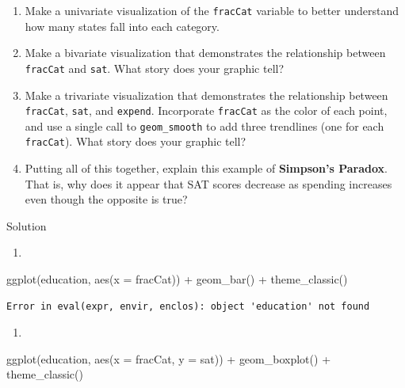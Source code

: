 \documentclass[
  letterpaper,
  DIV=11,
  numbers=noendperiod]{scrreprt}
\newenvironment{Shaded}{\begin{snugshade}}{\end{snugshade}}
\newcommand{\AttributeTok}[1]{\textcolor[rgb]{0.40,0.45,0.13}{#1}}
\newcommand{\FunctionTok}[1]{\textcolor[rgb]{0.28,0.35,0.67}{#1}}
\newcommand{\NormalTok}[1]{\textcolor[rgb]{0.00,0.23,0.31}{#1}}
\newcommand{\SpecialCharTok}[1]{\textcolor[rgb]{0.37,0.37,0.37}{#1}}
\providecommand{\tightlist}{%
  \setlength{\itemsep}{0pt}\setlength{\parskip}{0pt}}\usepackage{longtable,booktabs,array}
\begin{document}
\begin{enumerate}
\def\labelenumi{\alph{enumi}.}
\tightlist
\item
  Make a univariate visualization of the \texttt{fracCat} variable to
  better understand how many states fall into each category.\\
\item
  Make a bivariate visualization that demonstrates the relationship
  between \texttt{fracCat} and \texttt{sat}. What story does your
  graphic tell?
\item
  Make a trivariate visualization that demonstrates the relationship
  between \texttt{fracCat}, \texttt{sat}, and \texttt{expend}.
  Incorporate \texttt{fracCat} as the color of each point, and use a
  single call to \texttt{geom\_smooth} to add three trendlines (one for
  each \texttt{fracCat}). What story does your graphic tell?\\
\item
  Putting all of this together, explain this example of
  \textbf{Simpson's Paradox}. That is, why does it appear that SAT
  scores decrease as spending increases even though the opposite is
  true?
\end{enumerate}

Solution

\begin{enumerate}
\def\labelenumi{\alph{enumi}.}
\tightlist
\item
\end{enumerate}

\begin{Shaded}
\begin{Highlighting}[]
\FunctionTok{ggplot}\NormalTok{(education, }\FunctionTok{aes}\NormalTok{(}\AttributeTok{x =}\NormalTok{ fracCat)) }\SpecialCharTok{+}
  \FunctionTok{geom\_bar}\NormalTok{() }\SpecialCharTok{+} \FunctionTok{theme\_classic}\NormalTok{()}
\end{Highlighting}
\end{Shaded}

\begin{verbatim}
Error in eval(expr, envir, enclos): object 'education' not found
\end{verbatim}

\begin{enumerate}
\def\labelenumi{\alph{enumi}.}
\setcounter{enumi}{1}
\tightlist
\item
\end{enumerate}

\begin{Shaded}
\begin{Highlighting}[]
\FunctionTok{ggplot}\NormalTok{(education, }\FunctionTok{aes}\NormalTok{(}\AttributeTok{x =}\NormalTok{ fracCat, }\AttributeTok{y =}\NormalTok{ sat)) }\SpecialCharTok{+}
  \FunctionTok{geom\_boxplot}\NormalTok{() }\SpecialCharTok{+} \FunctionTok{theme\_classic}\NormalTok{()}
\end{Highlighting}
\end{Shaded}
\end{document}
